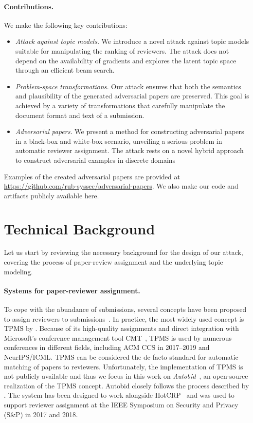 \documentclass[letterpaper,twocolumn,10pt]{article}
\begin{document}
\paragraph{Contributions.}
We make the following key contributions:
\begin{itemize}[topsep=3pt, itemsep=3pt, partopsep=3pt, parsep=3pt]
\item \emph{Attack against topic models.}  We introduce a novel attack against topic models suitable for manipulating the ranking of reviewers. The attack does not depend on the availability of gradients and explores the latent topic space through an efficient beam search.
\item \emph{Problem-space transformations.} Our attack ensures that both the semantics and plausibility of the generated adversarial papers are preserved. This goal is achieved by a variety of transformations that carefully manipulate the document format and text of a submission.
\item \emph{Adversarial papers.} 
We present a method for constructing adversarial papers in a black-box and white-box scenario, unveiling a serious problem in automatic reviewer assignment. The attack rests on a novel hybrid approach to construct adversarial examples in discrete domains
\end{itemize}
Examples of the created adversarial papers are provided at \href{https://github.com/rub-syssec/adversarial-papers}{https://github.com/rub-syssec/adversarial-papers}. We also make our code and artifacts publicly available here.
 \section{Technical Background}
\label{sec:background}

Let us start by reviewing the necessary background for the design of our attack, covering the process of paper-review assignment and the underlying topic modeling. 

\paragraph{Systems for paper-reviewer assignment.} 
To cope with the abundance of submissions, several concepts have been proposed to assign reviewers to submissions~\citep[e.g.,][]{liu-14-robust, li-13-automatic, stelmakh-19-peerreview, long-13-good}. In practice, the most widely used concept is \ac{TPMS} by \citet{charlin-13-toronto}. Because of its high-quality assignments and direct integration with Microsoft's conference management tool CMT~\cite{misc-cmt}, \ac{TPMS} is used by numerous conferences in different fields, including ACM CCS in 2017--2019 and NeurIPS/ICML. \ac{TPMS} can be considered the de facto standard for automatic matching of papers to reviewers. Unfortunately, the implementation of \ac{TPMS} is not publicly available and thus we focus in this work on \emph{Autobid}~\cite{misc-autobid}, an open-source realization of the \ac{TPMS} concept. 
Autobid closely follows the process described by \citet{charlin-13-toronto}. The system has been designed to work alongside HotCRP~\cite{misc-hotcrp} and was used to support reviewer assignment at the IEEE Symposium on Security and Privacy (S\&P) in 2017 and 2018.
\end{document}
